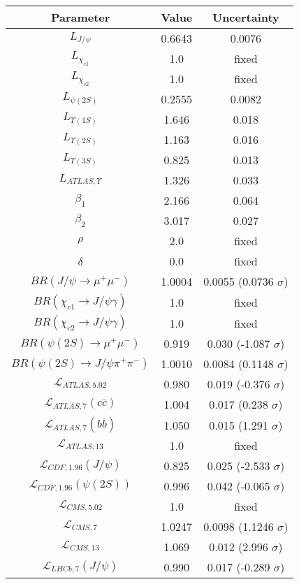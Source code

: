 \begin{table}[h!]
\centering
\begin{tabular}{c|c|c}
Parameter & Value & Uncertainty \\
\hline
$L_{J/\psi}$ & 0.6643 & 0.0076 \\
$L_{\chi_{c1}}$ & 1.0 & fixed \\
$L_{\chi_{c2}}$ & 1.0 & fixed \\
$L_{\psi(2S)}$ & 0.2555 & 0.0082 \\
$L_{\Upsilon(1S)}$ & 1.646 & 0.018 \\
$L_{\Upsilon(2S)}$ & 1.163 & 0.016 \\
$L_{\Upsilon(3S)}$ & 0.825 & 0.013 \\
$L_{ATLAS,\Upsilon}$ & 1.326 & 0.033 \\
$\beta_1$ & 2.166 & 0.064 \\
$\beta_2$ & 3.017 & 0.027 \\
$\rho$ & 2.0 & fixed \\
$\delta$ & 0.0 & fixed \\
$BR(J/\psi\rightarrow\mu^+\mu^-)$ & 1.0004 & 0.0055 (0.0736 $\sigma$) \\
$BR(\chi_{c1}\rightarrow J/\psi\gamma)$ & 1.0 & fixed \\
$BR(\chi_{c2}\rightarrow J/\psi\gamma)$ & 1.0 & fixed \\
$BR(\psi(2S)\rightarrow\mu^+\mu^-)$ & 0.919 & 0.030 (-1.087 $\sigma$) \\
$BR(\psi(2S)\rightarrow J/\psi\pi^+\pi^-)$ & 1.0010 & 0.0084 (0.1148 $\sigma$) \\
$\mathcal L_{ATLAS,5.02}$ & 0.980 & 0.019 (-0.376 $\sigma$) \\
$\mathcal L_{ATLAS,7}(c\overline c)$ & 1.004 & 0.017 (0.238 $\sigma$) \\
$\mathcal L_{ATLAS,7}(b\overline b)$ & 1.050 & 0.015 (1.291 $\sigma$) \\
$\mathcal L_{ATLAS,13}$ & 1.0 & fixed \\
$\mathcal L_{CDF,1.96}(J/\psi)$ & 0.825 & 0.025 (-2.533 $\sigma$) \\
$\mathcal L_{CDF,1.96}(\psi(2S))$ & 0.996 & 0.042 (-0.065 $\sigma$) \\
$\mathcal L_{CMS,5.02}$ & 1.0 & fixed \\
$\mathcal L_{CMS,7}$ & 1.0247 & 0.0098 (1.1246 $\sigma$) \\
$\mathcal L_{CMS,13}$ & 1.069 & 0.012 (2.996 $\sigma$) \\
$\mathcal L_{LHCb,7}(J/\psi)$ & 0.990 & 0.017 (-0.289 $\sigma$) \\

\end{tabular}
\end{table}
